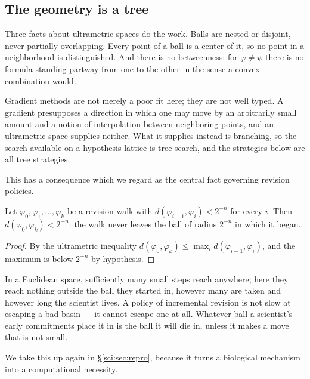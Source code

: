 \subsection{The geometry is a tree}\label{sci:S6.1}

Three facts about ultrametric spaces do the work. Balls are nested or disjoint, never partially
overlapping. Every point of a ball is a center of it, so no point in a neighborhood is distinguished.
And there is no betweenness: for $\varphi \ne \psi$ there is no formula standing partway from one to
the other in the sense a convex combination would.

\begin{remark}
\label{sci:rem:nogradient}
Gradient methods are not merely a poor fit here; they are not well typed. A gradient presupposes a
direction in which one may move by an arbitrarily small amount and a notion of interpolation between
neighboring points, and an ultrametric space supplies neither. What it supplies instead is branching,
so the search available on a hypothesis lattice is tree search, and the strategies below are all tree
strategies.
\end{remark}

This has a consequence which we regard as the central fact governing revision policies.

\begin{proposition}[Confinement]
\label{sci:prop:confinement}
Let $\varphi_0, \varphi_1, \ldots, \varphi_k$ be a revision walk with
$d(\varphi_{i-1}, \varphi_i) < 2^{-n}$ for every $i$. Then $d(\varphi_0, \varphi_k) < 2^{-n}$: the
walk never leaves the ball of radius $2^{-n}$ in which it began.
\end{proposition}

\begin{proof}
By the ultrametric inequality $d(\varphi_0, \varphi_k) \le \max_i d(\varphi_{i-1}, \varphi_i)$, and
the maximum is below $2^{-n}$ by hypothesis.
\end{proof}

In a Euclidean space, sufficiently many small steps reach anywhere; here they reach nothing outside the
ball they started in, however many are taken and however long the scientist lives. A policy of
incremental revision is not slow at escaping a bad basin --- it cannot escape one at all. Whatever ball
a scientist's early commitments place it in is the ball it will die in, unless it makes a move that is
not small.

We take this up again in \S\ref{sci:sec:repro}, because it turns a biological mechanism into a
computational necessity.

